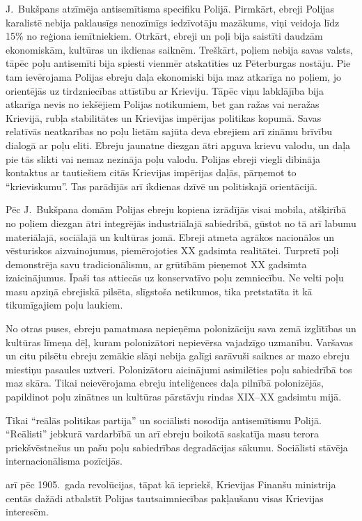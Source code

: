 \documentclass[twoside,a5paper,12pt,fleqn,openany]{extbook}
\begin{document}
J.~Bukšpans atzīmēja antisemītisma specifiku Polijā. Pirmkārt, ebreji Polijas karalistē nebija paklausīgs nenozīmīgs iedzīvotāju mazākums, viņi veidoja līdz 15\% no reģiona iemītniekiem. Otrkārt, ebreji un poļi bija saistīti daudzām ekonomiskām, kultūras un ikdienas saiknēm. Treškārt, poļiem nebija savas valsts, tāpēc poļu antisemīti bija spiesti vienmēr atskatīties uz Pēterburgas nostāju. Pie tam ievērojama Polijas ebreju daļa ekonomiski bija maz atkarīga no poļiem, jo orientējās uz tirdzniecības attīstību ar Krieviju. Tāpēc viņu labklājība bija atkarīga nevis no iekšējiem Polijas notikumiem, bet gan ražas vai neražas Krievijā, rubļa stabilitātes un Krievijas impērijas politikas kopumā. Savas relatīvās neatkarības no poļu lietām sajūta deva ebrejiem arī zināmu brīvību dialogā ar poļu eliti. Ebreju jaunatne diezgan ātri apguva krievu valodu, un daļa pie tās slikti vai nemaz nezināja poļu valodu. Polijas ebreji viegli dibināja kontaktus ar tautiešiem citās Krievijas impērijas daļās, pārņemot to ``krieviskumu''. Tas parādījās arī ikdienas dzīvē un politiskajā orientācijā.

Pēc J.~Bukšpana domām Polijas ebreju kopiena izrādījās visai mobila, atšķirībā no poļiem diezgan ātri integrējās industriālajā sabiedrībā, gūstot no tā arī labumu materiālajā, sociālajā un kultūras jomā. Ebreji atmeta agrākos nacionālos un vēsturiskos aizvainojumus, piemērojoties XX gadsimta realitātei. Turpretī poļi demonstrēja savu tradicionālismu, ar grūtībām pieņemot XX gadsimta izaicinājumus. Īpaši tas attiecās uz konservatīvo poļu zemniecību. Ne velti poļu masu apziņā ebrejiskā pilsēta, slīgstoša netikumos, tika pretstatīta it kā tikumīgajiem poļu laukiem.

No otras puses, ebreju pamatmasa nepieņēma polonizāciju sava zemā izglītības un kultūras līmeņa dēļ, kuram polonizātori nepievērsa vajadzīgo uzmanību. Varšavas un citu pilsētu ebreju zemākie slāņi nebija galīgi sarāvuši saiknes ar mazo ebreju miestiņu pasaules uztveri. Polonizātoru aicinājumi asimilēties poļu sabiedrībā tos maz skāra. Tikai neievērojama ebreju inteliģences daļa pilnībā polonizējās, papildinot poļu zinātnes un kultūras pārstāvju rindas XIX--XX gadsimtu mijā.

Tikai ``reālās politikas partija'' un sociālisti nosodīja antisemītismu Polijā. ``Reālisti'' jebkurā vardarbībā un arī ebreju boikotā saskatīja masu terora priekšvēstnešus un pašu poļu sabiedrības degradācijas sākumu. Sociālisti stāvēja internacionālisma pozīcijās.

 arī pēc 1905.~gada revolūcijas, tāpat kā iepriekš, Krievijas Finanšu ministrija centās dažādi atbalstīt Polijas tautsaimniecības pakļaušanu visas Krievijas interesēm.
\end{document}

